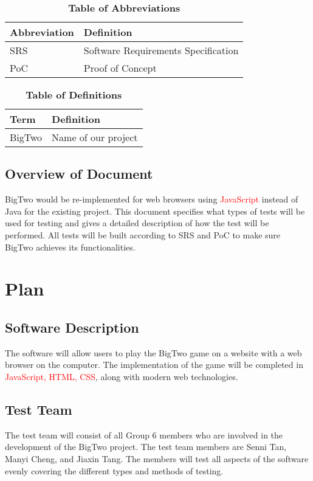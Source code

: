 \documentclass[12pt, titlepage]{article}
\begin{document}
\begin{table}[hbp]
\caption{\textbf{Table of Abbreviations}} \label{Table}

\begin{tabularx}{\textwidth}{p{3cm}X}
\toprule
\textbf{Abbreviation} & \textbf{Definition} \\
\midrule
SRS & Software Requirements Specification\\
PoC & Proof of Concept\\
\bottomrule
\end{tabularx}

\end{table}

\begin{table}[!htbp]
\caption{\textbf{Table of Definitions}} \label{Table}

\begin{tabularx}{\textwidth}{p{3cm}X}
\toprule
\textbf{Term} & \textbf{Definition}\\
\midrule
BigTwo & Name of our project\\
\bottomrule
\end{tabularx}

\end{table}	

\subsection{Overview of Document}
BigTwo would be re-implemented for web browsers using \textcolor{red}{JavaScript} instead of Java for the existing project. This document specifies what types of tests will be used for testing and gives a detailed description of how the test will be performed. All tests will be built according to SRS and PoC to make sure BigTwo achieves its functionalities.

\section{Plan}
	
\subsection{Software Description}
The software will allow users to play the BigTwo game on a website with a web browser on the computer. The implementation of the game will be completed in \textcolor{red}{JavaScript, HTML, CSS}, along with modern web technologies.

\subsection{Test Team}
The test team will consist of all Group 6 members who are involved in the development of the BigTwo project. The test team members are Senni Tan, Manyi Cheng, and Jiaxin Tang. The members will test all aspects of the software evenly covering the different types and methods of testing.
\end{document}

